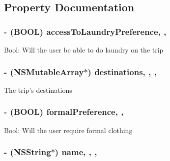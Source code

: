 \subsection{Property Documentation}
\hypertarget{interface_trip_a5807a192e5170272e808780c5e74ca5a}{
\subsubsection[{access\-To\-Laundry\-Preference}]{\setlength{\rightskip}{0pt plus 5cm}-\/ (B\-O\-O\-L) access\-To\-Laundry\-Preference\hspace{0.3cm}{\ttfamily [read]}, {\ttfamily [write]}, {\ttfamily [atomic]}}}\label{interface_trip_a5807a192e5170272e808780c5e74ca5a}
Bool\-: Will the user be able to do laundry on the trip \hypertarget{interface_trip_a396ca8de2ed1b20c1255cbb5e9b524ed}{
\subsubsection[{destinations}]{\setlength{\rightskip}{0pt plus 5cm}-\/ (N\-S\-Mutable\-Array$\ast$) destinations\hspace{0.3cm}{\ttfamily [read]}, {\ttfamily [write]}, {\ttfamily [nonatomic]}, {\ttfamily [strong]}}}\label{interface_trip_a396ca8de2ed1b20c1255cbb5e9b524ed}
The trip's destinations \hypertarget{interface_trip_a4ea48dfbac9dff7d387617f1113c3d08}{
\subsubsection[{formal\-Preference}]{\setlength{\rightskip}{0pt plus 5cm}-\/ (B\-O\-O\-L) formal\-Preference\hspace{0.3cm}{\ttfamily [read]}, {\ttfamily [write]}, {\ttfamily [atomic]}}}\label{interface_trip_a4ea48dfbac9dff7d387617f1113c3d08}
Bool\-: Will the user require formal clothing \hypertarget{interface_trip_a66e63287102687fe25366d61889fe8e1}{
\subsubsection[{name}]{\setlength{\rightskip}{0pt plus 5cm}-\/ (N\-S\-String$\ast$) name\hspace{0.3cm}{\ttfamily [read]}, {\ttfamily [write]}, {\ttfamily [nonatomic]}, {\ttfamily [strong]}}}\label{interface_trip_a66e63287102687fe25366d61889fe8e1}
